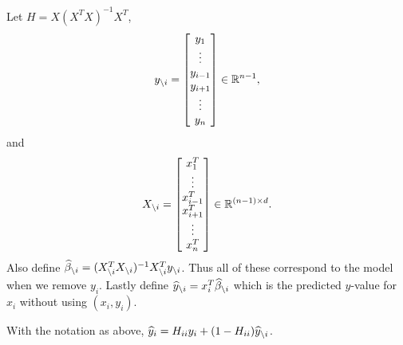 \begin{notn}
    Let $H=X(X^TX)^{-1}X^T$, 
    \[y_{\setminus i} = \begin{bmatrix}
        y_1\\\vdots\\ y_{i-1} \\ y_{i+1} \\ \vdots \\ y_n
    \end{bmatrix} \in {\mathbb R}^{n-1},\]
    and
    \[X_{\setminus i} = \begin{bmatrix}
        x_1^T\\\vdots\\ x_{i-1}^T \\ x_{i+1}^T \\ \vdots \\ x_n^T
    \end{bmatrix} \in {\mathbb R}^{(n-1)\times d}. \]
    Also define $\widehat{\beta}_{\setminus i} = (X_{\setminus i}^TX_{\setminus i})^{-1}X^T_{\setminus i}y_{\setminus i}$. Thus all of these correspond to the model when we remove $y_i$. Lastly define $\widehat{y}_{\setminus i} = x_i^T\widehat{\beta}_{\setminus i}$ which is the predicted $y$-value for $x_i$ without using $(x_i, y_i)$. 
\end{notn}
\begin{prop}
    With the notation as above, $\widehat{y}_i = H_{ii}y_i+(1-H_{ii})\widehat{y}_{\setminus i}$.
\end{prop}
